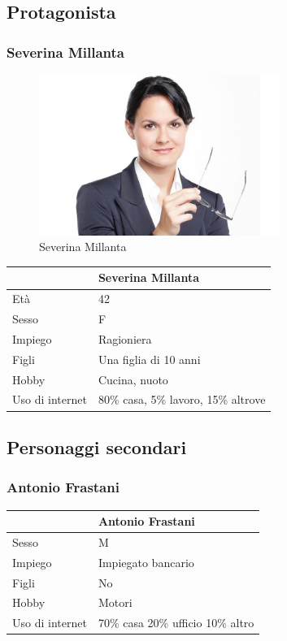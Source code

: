 \documentclass[12pt,italian,]{report}
\begin{document}
\hypertarget{protagonista}{%
\subsection{Protagonista}\label{protagonista}}

\hypertarget{severina-millanta}{%
\subsubsection{Severina Millanta}\label{severina-millanta}}

\begin{figure}[h]
\centering
\includegraphics[width=0.7\textwidth,height=\textheight]{img/severina.jpg}
\caption{Severina Millanta}
\end{figure}

\begin{longtable}[]{@{}ll@{}}
\toprule
& Severina Millanta\tabularnewline
\midrule
\endhead
Età & 42\tabularnewline
Sesso & F\tabularnewline
Impiego & Ragioniera\tabularnewline
Figli & Una figlia di 10 anni\tabularnewline
Hobby & Cucina, nuoto\tabularnewline
Uso di internet & 80\% casa, 5\% lavoro, 15\% altrove\tabularnewline
\bottomrule
\end{longtable}

\hypertarget{personaggi-secondari}{%
\subsection{Personaggi secondari}\label{personaggi-secondari}}

\hypertarget{antonio-frastani}{%
\subsubsection{Antonio Frastani}\label{antonio-frastani}}

\begin{longtable}[]{@{}ll@{}}
\toprule
& Antonio Frastani\tabularnewline
\midrule
\endhead
Sesso & M\tabularnewline
Impiego & Impiegato bancario\tabularnewline
Figli & No\tabularnewline
Hobby & Motori\tabularnewline
Uso di internet & 70\% casa 20\% ufficio 10\% altro\tabularnewline
\bottomrule
\end{longtable}
\end{document}
